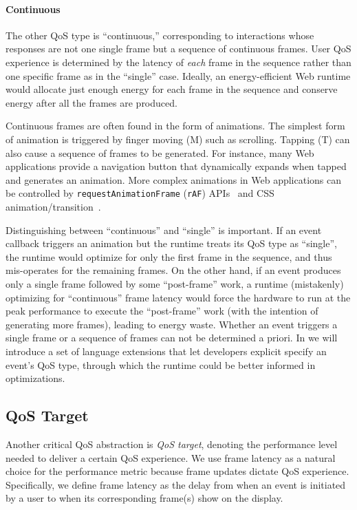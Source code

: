 \paragraph{Continuous} The other QoS type is ``continuous,'' corresponding to interactions whose responses are not one single frame but a sequence of continuous frames. User QoS experience is determined by the latency of \textit{each} frame in the sequence rather than one specific frame as in the ``single'' case. Ideally, an energy-efficient Web runtime would allocate just enough energy for each frame in the sequence and conserve energy after all the frames are produced.

Continuous frames are often found in the form of animations. The simplest form of animation is triggered by finger moving (M) such as scrolling. Tapping (T) can also cause a sequence of frames to be generated. For instance, many Web applications provide a navigation button that dynamically expands when tapped and generates an animation. More complex animations in Web applications can be controlled by \texttt{requestAnimationFrame} (\texttt{rAF}) APIs~\cite{animationtiming} and CSS animation/transition~\cite{cssanimations,csstransitions}.

Distinguishing between ``continuous'' and ``single'' is important. If an event callback triggers an animation but the runtime treats its QoS type as ``single'', the runtime would optimize for only the first frame in the sequence, and thus mis-operates for the remaining frames. On the other hand, if an event produces only a single frame followed by some ``post-frame'' work, a runtime (mistakenly) optimizing for ``continuous'' frame latency would force the hardware to run at the peak performance to execute the ``post-frame'' work (with the intention of generating more frames), leading to energy waste. Whether an event triggers a single frame or a sequence of frames can not be determined a priori. In  we will introduce a set of language extensions that let developers explicit specify an event's QoS type, through which the runtime could be better informed in optimizations.

\subsection{QoS Target}
\label{sec:lang:abst:target}

Another critical QoS abstraction is \textit{QoS target}, denoting the performance level needed to deliver a certain QoS experience. We use frame latency as a natural choice for the performance metric because frame updates dictate QoS experience. Specifically, we define frame latency as the delay from when an event is initiated by a user to when its corresponding frame(s) show on the display.

